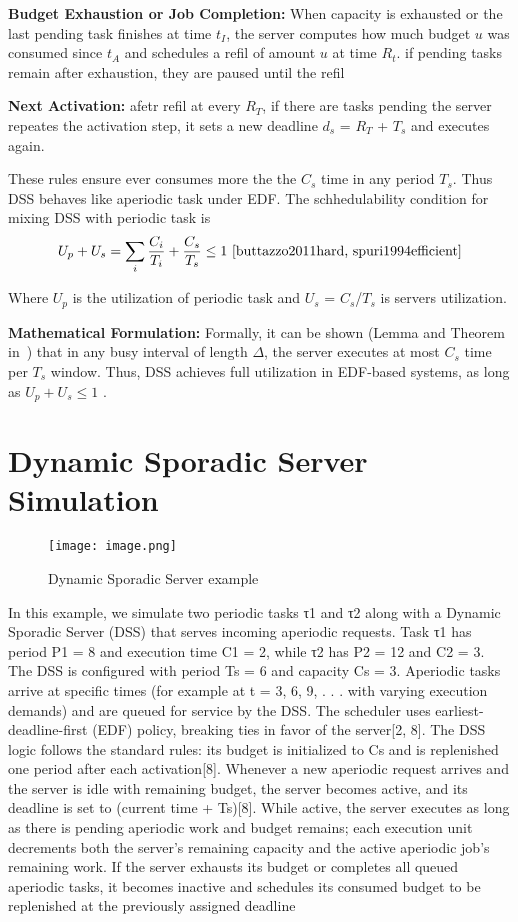 \documentclass[conference]{IEEEtran}
\begin{document}
\textbf{Budget Exhaustion or Job Completion:} When capacity is exhausted or the last pending task finishes at time $t_I$, the server computes how much budget $u$ was consumed since $t_A$ and schedules a refil of amount $u$ at time $R_t$. if pending tasks remain after exhaustion, they are paused until the refil\cite{sprunt1989aperiodic, spuri1994efficient} 

\textbf{Next Activation:} afetr refil at every $R_T$, if there are tasks pending the server repeates the activation step, it sets a new deadline $d_s$ = $R_T$ + $T_s$ and executes again. 

These rules ensure ever consumes more the the $C_s$ time in any period $T_s$\cite{spuri1994efficient,buttazzo2011hard}. Thus DSS behaves like aperiodic task under EDF. The schhedulability condition for mixing DSS with periodic task is\cite{buttazzo2011hard}
\[
U_p + U_s = \sum_i \frac{C_i}{T_i} + \frac{C_s}{T_s} \leq 1
\ \cite{buttazzo2011hard, spuri1994efficient} \]

Where $U_p$ is the utilization of periodic task and $U_s$ = $C_s$/$T_s$ is servers utilization\cite{buttazzo2011hard}.

\textbf{Mathematical Formulation:} Formally, it can be shown (Lemma and Theorem in~\cite{spuri1994efficient}) that in any busy interval of length $\Delta$, the server executes at most $C_s$ time per $T_s$ window. 
Thus, DSS achieves full utilization in EDF-based systems, as long as $U_p + U_s \leq 1$  \cite{buttazzo2011hard}.

\section{Dynamic Sporadic Server Simulation}
\begin{figure}
    \centering
    \texttt{[image: image.png]}
    \caption{Dynamic Sporadic Server example\cite{buttazzo2011hard}}
    \label{fig:enter-label}
\end{figure}

In this example, we simulate two periodic tasks τ1 and
τ2 along with a Dynamic Sporadic Server (DSS) that serves
incoming aperiodic requests. Task τ1 has period P1 = 8
and execution time C1 = 2, while τ2 has P2 = 12 and
C2 = 3. The DSS is configured with period Ts = 6 and
capacity Cs = 3. Aperiodic tasks arrive at specific times (for
example at t = 3, 6, 9, . . . with varying execution demands)
and are queued for service by the DSS. The scheduler uses
earliest-deadline-first (EDF) policy, breaking ties in favor of
the server[2, 8].
The DSS logic follows the standard rules: its budget is
initialized to Cs and is replenished one period after each
activation[8]. Whenever a new aperiodic request arrives and
the server is idle with remaining budget, the server becomes
active, and its deadline is set to (current time + Ts)[8]. While
active, the server executes as long as there is pending aperiodic
work and budget remains; each execution unit decrements
both the server’s remaining capacity and the active aperiodic
job’s remaining work. If the server exhausts its budget or
completes all queued aperiodic tasks, it becomes inactive
and schedules its consumed budget to be replenished at the
previously assigned deadline\cite{buttazzo2011hard}
\end{document}
